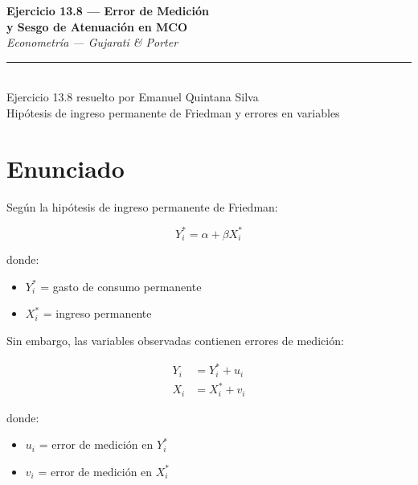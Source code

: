 \documentclass[12pt,letterpaper]{article}
\begin{document}

\begin{center}

{\LARGE\bfseries Ejercicio 13.8 --- Error de Medición}\\[4pt]

{\LARGE\bfseries y Sesgo de Atenuación en MCO}\\[12pt]

{\large\itshape Econometría --- Gujarati \& Porter}\\[10pt]

\rule{0.55\linewidth}{0.6pt}\\[10pt]

{\normalsize
Ejercicio 13.8 resuelto por Emanuel Quintana Silva}\\[4pt]

{\small
Hipótesis de ingreso permanente de Friedman y errores en variables}

\end{center}

\vspace{12pt}

\section{Enunciado}

Según la hipótesis de ingreso permanente de Friedman:

\begin{equation}
Y_i^{*}=\alpha+\beta X_i^{*}
\end{equation}

donde:

\begin{itemize}
\item $Y_i^{*}$ = gasto de consumo permanente
\item $X_i^{*}$ = ingreso permanente
\end{itemize}

Sin embargo, las variables observadas contienen errores de medición:

\begin{align}
Y_i &= Y_i^{*}+u_i \\
X_i &= X_i^{*}+v_i
\end{align}

donde:

\begin{itemize}
\item $u_i$ = error de medición en $Y_i^{*}$
\item $v_i$ = error de medición en $X_i^{*}$
\end{itemize}
\end{document}
